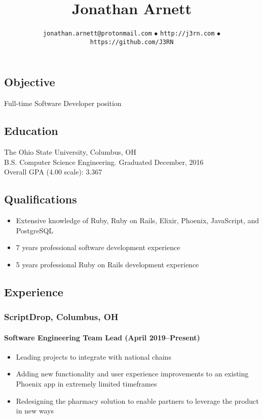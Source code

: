 \documentclass[]{article}
\begin{document}
\title{Jonathan Arnett}
\author{\texttt{jonathan.arnett@protonmail.com} $\bullet$ \texttt{http://j3rn.com} $\bullet$ \texttt{https://github.com/J3RN}}
\date{}
\maketitle

\subsection*{Objective}
Full-time Software Developer position

\subsection*{Education}
The Ohio State University, Columbus, OH \\
B.S. Computer Science Engineering. Graduated December, 2016 \\
Overall GPA (4.00 scale): 3.367

\subsection*{Qualifications}
\begin{itemize}
\item Extensive knowledge of Ruby, Ruby on Rails, Elixir, Phoenix, JavaScript, and PostgreSQL
\item 7 years professional software development experience
\item 5 years professional Ruby on Rails development experience
\end{itemize}

\subsection*{Experience}

\subsubsection*{ScriptDrop, Columbus, OH}
\paragraph{Software Engineering Team Lead (April 2019--Present)}
\begin{itemize}
\item Leading projects to integrate with national chains
\item Adding new functionality and user experience improvements to an existing Phoenix app in extremely limited timeframes
\item Redesigning the pharmacy solution to enable partners to leverage the product in new ways
\end{itemize}
\end{document}
